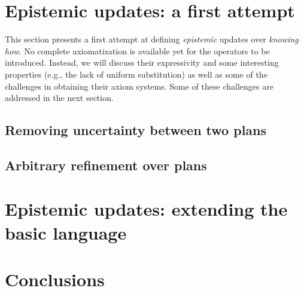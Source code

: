 \documentclass[sn-mathphys-num]{sn-jnl}%
\begin{document}
\section{Epistemic updates: a first attempt}
\label{sec:epistemic-basic} 

This section presents a first attempt at defining \emph{epistemic} updates over \emph{knowing how}. No complete axiomatization is available yet for the operators to be introduced. Instead, we will discuss their expressivity and some interesting properties (e.g., the lack of uniform substitution) as well as some of the challenges in obtaining their axiom systems. Some of these challenges are addressed in the next section.

\subsection{Removing uncertainty between two plans}
\label{sec:ref}


\subsection{Arbitrary refinement over plans}
\label{sec:aref}


% 

\section{Epistemic updates: extending the basic language}
\label{sec:extension}









% 



% 

\section{Conclusions}
\label{sec:final}

\end{document}
